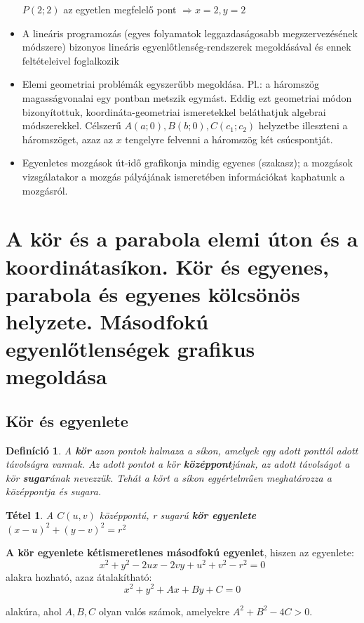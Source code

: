 \documentclass[12pt,a4paper]{article}
\newtheorem{theorem}{Tétel} [section]
\newtheorem{definition}{Definíció} [section]
\begin{document}
\begin{itemize}
$P(2;2)$ az egyetlen megfelelő pont $\Rightarrow x=2, y=2$

\item  A lineáris programozás (egyes folyamatok leggazdaságosabb megszervezésének módszere) bizonyos lineáris egyenlőtlenség-rendszerek megoldásával és ennek feltételeivel foglalkozik
\item Elemi geometriai problémák egyszerűbb megoldása. Pl.: a háromszög magasságvonalai egy pontban metszik egymást. Eddig ezt geometriai módon bizonyítottuk, koordináta-geometriai ismeretekkel beláthatjuk algebrai módszerekkel. Célszerű $A(a;0), B(b;0), C(c_1;c_2)$ helyzetbe illeszteni a háromszöget, azaz az $x$ tengelyre felvenni a háromszög két csúcspontját.
\item  Egyenletes mozgások út-idő grafikonja mindig egyenes (szakasz); a mozgások vizsgálatakor a mozgás pályájának ismeretében információkat kaphatunk a mozgásról.
\end{itemize}
\newpage


\section{A kör és a parabola elemi úton és a koordinátasíkon. Kör és egyenes, parabola és egyenes kölcsönös helyzete. Másodfokú egyenlőtlenségek grafikus megoldása}

\subsection{Kör és egyenlete}

\begin{definition}
A \textbf{kör} azon pontok halmaza a síkon, amelyek egy adott ponttól adott távolságra vannak. Az adott pontot a kör \textbf{középpont}jának, az adott távolságot a kör \textbf{sugar}ának nevezzük. Tehát a kört a síkon egyértelműen meghatározza a középpontja és sugara.
\end{definition}

\begin{theorem}
A $C(u, v)$ középpontú, r sugarú \textbf{kör egyenlete} $(x-u)^2+(y-v)^2=r^2$
\end{theorem}

\textbf{A kör egyenlete kétismeretlenes másodfokú egyenlet}, hiszen az egyenlete:
$$x^2+y^2-2ux-2vy+u^2+v^2-r^2=0$$
alakra hozható, azaz átalakítható:
$$x^2+y^2+Ax+By+C=0$$

alakúra, ahol $A, B, C$ olyan valós számok, amelyekre $A^2+B^2-4C>0$.
\end{document}
